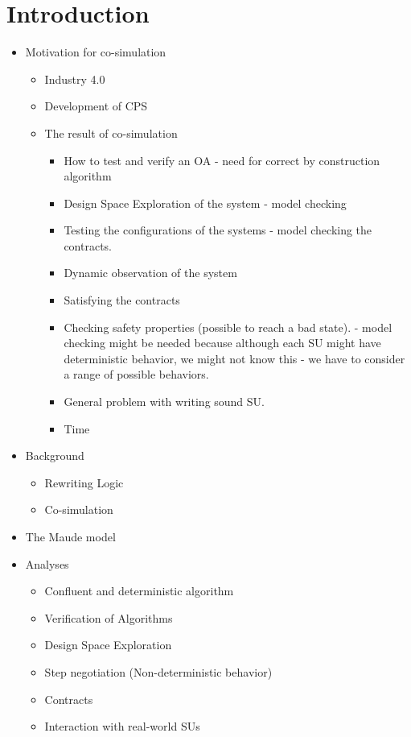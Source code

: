 \section{Introduction}\label{sc:introduction}
\begin{itemize}
    \item Motivation for co-simulation
    \begin{itemize}
      \item Industry 4.0
      \item Development of CPS
      \item The result of co-simulation
      \begin{itemize}
      \item How to test and verify an OA - need for correct by construction algorithm
      \item Design Space Exploration of the system - model checking 
      \item Testing the configurations of the systems - model checking the contracts.
      \item Dynamic observation of the system
      \item Satisfying the contracts
      \item Checking safety properties (possible to reach a bad state). - model checking might be needed because although each SU might have deterministic behavior, we might not know this - we have to consider a range of possible behaviors.
      \item General problem with writing sound SU.
      \item Time 
    \end{itemize}
    \end{itemize}
    \item Background
    \begin{itemize}
      \item Rewriting Logic
      \item Co-simulation
    \end{itemize}
    \item The Maude model
    \item Analyses
    \begin{itemize}
      \item Confluent and deterministic algorithm
      \item Verification of Algorithms
      \item Design Space Exploration
      \item Step negotiation (Non-deterministic behavior)
      \item Contracts
      \item Interaction with real-world SUs
    \end{itemize}
  \end{itemize}
  
